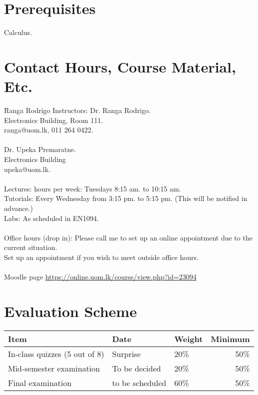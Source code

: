 \documentclass[11pt, a4paper]{article}
\begin{document}
\section{Prerequisites}
Calculus.


\section{Contact Hours, Course Material, Etc.}
\begin{tabbing}
  \hspace{2in}\= Ranga Rodrigo \kill
  Instructors: \>  Dr. Ranga Rodrigo.\\
  \> Electronics Building, Room 111.\\
                \> ranga@uom.lk, 011 264 0422.\\
                \\
                 \>  Dr. Upeka Premaratne.\\
  \> Electronics Building\\
                \> upeka@uom.lk.\\
                \\
  Lectures:  hours per week: Tuesdays 8:15 am. to 10:15 am.\\
  Tutorials: \> Every Wednesday from 3:15 pm. to 5:15 pm. (This will be notified in advance.)\\
  Labs: \> As scheduled in EN1094.\\
  \\
  Office hours (drop in): \> Please call me to set up an online appointment due to the current situation.\\
  \> Set up an appointment if you wish to meet outside office hours.\\
  \\
  Moodle page \>
  \href{https://online.uom.lk/course/view.php?id=23094}{https://online.uom.lk/course/view.php?id=23094}

\end{tabbing} 

\section{Evaluation Scheme}
\noindent
\begin{tabular}{@{}lllr@{}}
  \toprule
  Item   & Date& Weight& Minimum\\
  \midrule
  In-class quizzes (5 out of 8) & Surprise & 20\% & 50\%\\

  Mid-semester examination  &  To be decided& 20\% & 50\%\\

  Final examination & to be scheduled & 60\% & 50\%\\
  \bottomrule
\end{tabular}
\end{document}
